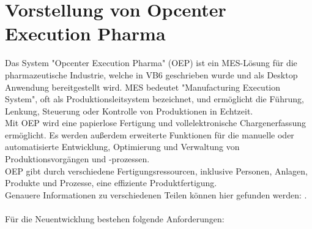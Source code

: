 \documentclass[ngerman]{article}
\begin{document}
    \section{Vorstellung von Opcenter Execution Pharma}
    \label{VorstellungOEP}
    Das System "Opcenter Execution Pharma" (OEP) ist ein MES-Lösung für die pharmazeutische Industrie, welche in VB6 geschrieben wurde und als Desktop Anwendung bereitgestellt wird. MES bedeutet "Manufacturing Execution System", oft als Produktionsleitsystem bezeichnet, und ermöglicht die Führung, Lenkung, Steuerung oder Kontrolle von Produktionen in Echtzeit.\\
    Mit OEP wird eine papierlose Fertigung und vollelektronische Chargenerfassung ermöglicht. Es werden außerdem erweiterte Funktionen für die manuelle oder automatisierte Entwicklung, Optimierung und Verwaltung von Produktionsvorgängen und -prozessen.\\
    OEP gibt durch verschiedene Fertigungsressourcen, inklusive Personen, Anlagen, Produkte und Prozesse, eine effiziente Produktfertigung.\\
    Genauere Informationen zu verschiedenen Teilen können hier gefunden werden: \cite[Hier]{OEP Main Page}.\\\\
    Für die Neuentwicklung bestehen folgende Anforderungen:
\end{document}
